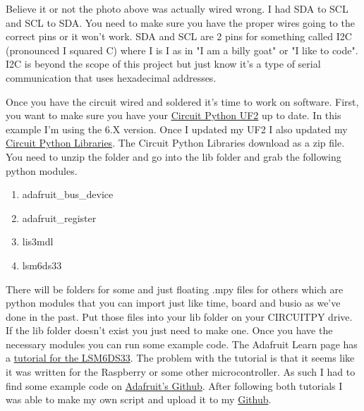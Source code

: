 Believe it or not the photo above was actually wired wrong. I had SDA to SCL and SCL to SDA. You need to make sure you have the proper wires going to the correct pins or it won’t work. SDA and SCL are 2 pins for something called I2C (pronounced I squared C) where I is I as in "I am a billy goat" or "I like to code". I2C is beyond the scope of this project but just know it’s a type of serial communication that uses hexadecimal addresses.

Once you have the circuit wired and soldered it’s time to work on software. First, you want to make sure you have your \href{https://circuitpython.org/downloads}{Circuit Python UF2} up to date. In this example I’m using the 6.X version. Once I updated my UF2 I also updated my \href{https://circuitpython.org/libraries}{Circuit Python Libraries}. The Circuit Python Libraries download as a zip file. You need to unzip the folder and go into the lib folder and grab the following python modules.
\begin{enumerate}[itemsep=-5pt]
\item adafruit\_bus\_device
\item adafruit\_register
\item lis3mdl
\item lsm6ds33
\end{enumerate}
There will be folders for some and just floating .mpy files for others which are python modules that you can import just like time, board and busio as we’ve done in the past. Put those files into your lib folder on your CIRCUITPY drive. If the lib folder doesn’t exist you just need to make one. Once you have the necessary modules you can run some example code. The Adafruit Learn page has a \href{https://learn.adafruit.com/lsm6ds33-6-dof-imu=accelerometer-gyro/python-circuitpython}{tutorial for the LSM6DS33}. The problem with the tutorial is that it seems like it was written for the Raspberry or some other microcontroller. As such I had to find some example code on \href{https://github.com/adafruit/Adafruit_CircuitPython_LSM6DS/blob/master/examples/lsm6ds_lsm6ds33_simpletest.py}{Adafruit's Github}. After following both tutorials I was able to make my own script and upload it to my \href{https://github.com/cmontalvo251/Microcontrollers/blob/master/Circuit_Playground/CircuitPython/Accelerometer/external_lis3mdl_lsm6dss.py}{Github}.
